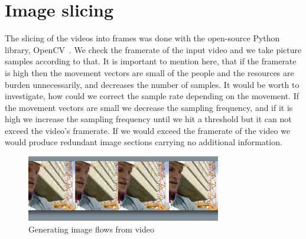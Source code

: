 \section{Image slicing}
The slicing of the videos into frames was done with the open-source Python library, OpenCV~\cite{opencv}. We check the framerate of the input video and we take picture samples according to that. It is important to mention here, that if the framerate is high then the movement vectors are small of the people and the resources are burden unnecessarily, and decreases the number of samples. It would be worth to investigate, how could we correct the sample rate depending on the movement. If the movement vectors are small we decrease the sampling frequency, and if it is high we increase the sampling frequency until we hit a threshold but it can not exceed the video's framerate. If we would exceed the framerate of the video we would produce redundant image sections carrying no additional information.

\begin{figure}[!ht]
\centering
\includegraphics[width=85mm,keepaspectratio]{fig/h246_composite.png}
\caption{Generating image flows from video}
\label{fig:image_slicing} 
\end{figure}

